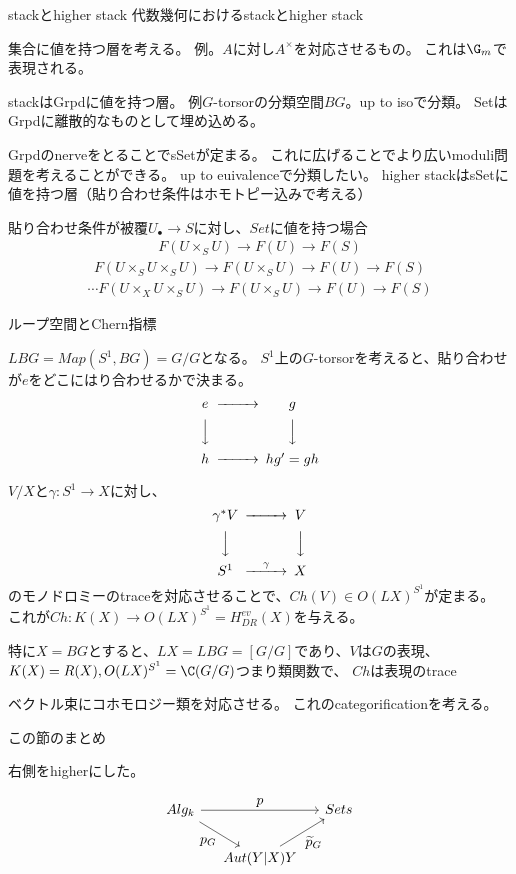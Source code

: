 \documentclass[dvipdfmx]{beamer}
\begin{document}
\begin{frame}{stackとhigher stack}
代数幾何におけるstackとhigher stack

集合に値を持つ層を考える。
例。$A$に対し$A^\times$を対応させるもの。
これは$\G_m$で表現される。

stackはGrpdに値を持つ層。
例$G$-torsorの分類空間$BG$。up to isoで分類。
SetはGrpdに離散的なものとして埋め込める。

GrpdのnerveをとることでsSetが定まる。
これに広げることでより広いmoduli問題を考えることができる。
up to euivalenceで分類したい。
higher stackはsSetに値を持つ層（貼り合わせ条件はホモトピー込みで考える）

貼り合わせ条件が被覆$U_\bullet\to S$に対し、$Set$に値を持つ場合
\begin{align*}
F(U\times_SU) \to F(U) \to F(S)
\end{align*}
\begin{align*}
F(U\times_SU\times_SU)\to F(U\times_SU) \to F(U) \to F(S)
\end{align*}
\begin{align*}
\cdots F(U\times_XU\times_SU) \to F(U\times_SU) \to F(U) \to F(S)
\end{align*}
\end{frame}

\begin{frame}{ループ空間とChern指標}

$LBG=Map(S^1,BG)=G/G$となる。
$S^1$上の$G$-torsorを考えると、貼り合わせが$e$をどこにはり合わせるかで決まる。
\[
\begin{CD}
e@>>>g\\
@VVV@VVV\\
h@>>>hg'=gh
\end{CD}
\]

$V/X$と$\gamma:S^1\to X$に対し、
\[
\begin{CD}
\gamma^*V@>>>V\\
@VVV@VVV\\
S^1@>\gamma>>X
\end{CD}
\]
のモノドロミーのtraceを対応させることで、$Ch(V)\in O(LX)^{S^1}$が定まる。
これが$Ch:K(X) \to O(LX)^{S^1}=H^{ev}_{DR}(X)$を与える。

特に$X=BG$とすると、$LX=LBG=[G/G]$であり、$V$は$G$の表現、$K(X)=R(X), O(LX)^{S^1}=\C(G/G)$つまり類関数で、
$Ch$は表現のtrace

ベクトル束にコホモロジー類を対応させる。
これのcategorificationを考える。
\end{frame}

\begin{frame}[fragile]{この節のまとめ}

右側をhigherにした。

\[\begin{tikzcd}[column sep=small]
Alg_k \ar[dr, "\displaystyle{p_G}"'] \ar[rr, "\displaystyle{p}"]& &  Sets \\
& Aut(Y|X) Y \ar[ur, "\displaystyle{\widetilde{p}_G}"'] &
\end{tikzcd}\]
\end{frame}
\end{document}
